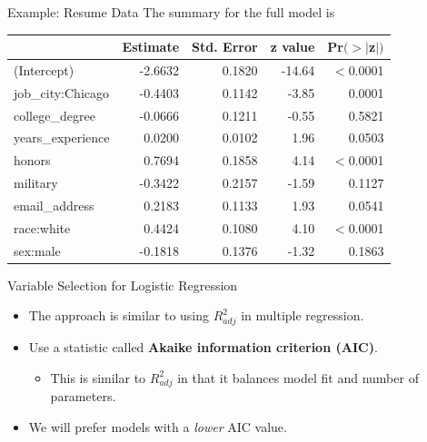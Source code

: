 \begin{frame}{Example: Resume Data}
    The summary for the full model is
    \begin{table}[h]
        \centering
        \begin{tabular}{l rrrr}
            \hline
                    & Estimate & Std. Error & z value & Pr$(>|$z$|)$ \\
            \hline
(Intercept)         & -2.6632 & 0.1820 & -14.64 & $<$0.0001 \\
job\_city:Chicago   & -0.4403 & 0.1142 & -3.85 & 0.0001 \\
college\_degree     & -0.0666 & 0.1211 & -0.55 & 0.5821 \\
years\_experience   & 0.0200 & 0.0102 & 1.96 & 0.0503 \\
honors              & 0.7694 & 0.1858 & 4.14 & $<$0.0001 \\
military            & -0.3422 & 0.2157 & -1.59 & 0.1127 \\
email\_address      & 0.2183 & 0.1133 & 1.93 & 0.0541 \\
race:white          & 0.4424 & 0.1080 & 4.10 & $<$0.0001 \\
sex:male            & -0.1818 & 0.1376 & -1.32 & 0.1863 \\
            \hline
        \end{tabular}
    \end{table}
\end{frame}

\begin{frame}{Variable Selection for Logistic Regression}
    \begin{itemize}
        \item The approach is similar to using $R^2_{adj}$ in multiple regression.
        \item Use a statistic called \textbf{Akaike information criterion (AIC)}.
        \begin{itemize}
            \item This is similar to $R^2_{adj}$ in that it balances model fit and number of parameters.
        \end{itemize}
        \item We will prefer models with a \textit{lower} AIC value.
    \end{itemize}
\end{frame}

